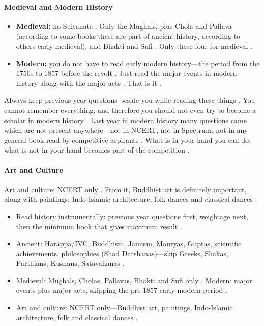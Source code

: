 \paragraph{Medieval and Modern History}
\begin{itemize}
    \item \textbf{Medieval:} no Sultanate . Only the Mughals, plus Chola and Pallava (according to some books these are part of ancient history, according to others early medieval), and Bhakti and Sufi . Only these four for medieval .
    \item \textbf{Modern:} you do not have to read early modern history---the period from the 1750s to 1857 before the revolt . Just read the major events in modern history along with the major acts . That is it .
\end{itemize}
Always keep previous year questions beside you while reading these things . You cannot remember everything, and therefore you should not even try to become a scholar in modern history . Last year in modern history many questions came which are not present anywhere---not in NCERT, not in Spectrum, not in any general book read by competitive aspirants . What is in your hand you can do; what is not in your hand becomes part of the competition .

\paragraph{Art and Culture}
Art and culture: NCERT only . From it, Buddhist art is definitely important, along with paintings, Indo-Islamic architecture, folk dances and classical dances .

\begin{QuickRevision}
\begin{itemize}
    \item Read history instrumentally: previous year questions first, weightage next, then the minimum book that gives maximum result .
    \item Ancient: Harappa/IVC, Buddhism, Jainism, Mauryas, Guptas, scientific achievements, philosophies (Shad Darshanas)---skip Greeks, Shakas, Parthians, Kushans, Satavahanas .
    \item Medieval: Mughals, Cholas, Pallavas, Bhakti and Sufi only . Modern: major events plus major acts, skipping the pre-1857 early modern period .
    \item Art and culture: NCERT only---Buddhist art, paintings, Indo-Islamic architecture, folk and classical dances .
\end{itemize}
\end{QuickRevision}

